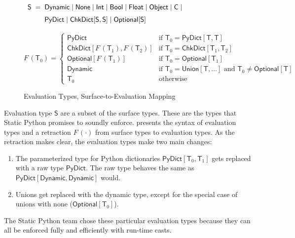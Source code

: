 \documentclass[english,cleveref,submission]{programming}
\makeatletter
\newcommand{\SP}{Static Python}
\newcommand{\defeq}{=}
\newcommand{\mfeq}{=}
\newcommand{\langmid}{\mid} %
\newenvironment{langarray}{\(\def\arraystretch{1.5}\begin{array}{l@{\hspace{2mm}}c@{\hspace{2mm}}l}}{\end{array}\)}
\newcommand{\typefont}[1]{\mathsf{#1}}
\newcommand{\paramtype}[2]{#1[#2]}
\newcommand{\sptype}{\typefont{T}}
\newcommand{\spteval}{\typefont{S}}
\newcommand{\sptclass}{\typefont{C}}
\newcommand{\sptint}{\typefont{Int}}
\newcommand{\sptbool}{\typefont{Bool}}
\newcommand{\sptfloat}{\typefont{Float}}
\newcommand{\sptdyn}{\typefont{Dynamic}}
\newcommand{\sptobject}{\typefont{Object}}
\newcommand{\sptnone}{\typefont{None}}
\newcommand{\sptoptional}[1]{\paramtype{\typefont{Optional}}{#1}}
\newcommand{\sptunion}[1]{\paramtype{\typefont{Union}}{#1}}
\newcommand{\sptrawpydict}{\typefont{PyDict}}
\newcommand{\sptpydict}[2]{\paramtype{\sptrawpydict}{#1, #2}}
\newcommand{\sptchkdict}[2]{\paramtype{\typefont{ChkDict}}{#1, #2}}
\newcommand{\mfapply}[2]{#1\,(#2)}
\newcommand{\mffont}[1]{\mathit{#1}}
\newcommand{\mftypeF}[1]{\mfapply{\mffont{F}}{#1}}
\makeatother
\begin{document}
\begin{figure}[t]
  \begin{langarray}
    \spteval & \defeq &
      \sptdyn \langmid
      \sptnone \langmid
      \sptint \langmid
      \sptbool \langmid
      \sptfloat \langmid
      \sptobject \langmid
      \sptclass \langmid
    \\ & &
      \sptrawpydict \langmid
      \sptchkdict{\spteval}{\spteval} \langmid
      \sptoptional{\spteval}
  \end{langarray}

  \bigskip
  \(
    \mftypeF{\sptype_0}
    \mfeq
    \left\{\begin{array}{ll}
      \sptrawpydict & \mbox{if $\sptype_0 = \sptpydict{\sptype}{\sptype}$}
    \\
      \sptchkdict{\mftypeF{\sptype_1}}{\mftypeF{\sptype_2}} & \mbox{if $\sptype_0 = \sptchkdict{\sptype_1}{\sptype_2}$}
    \\
      \sptoptional{\mftypeF{\sptype_1}} & \mbox{if $\sptype_0 = \sptoptional{\sptype_1}$}
    \\
      \sptdyn & \mbox{if $\sptype_0 = \sptunion{\sptype, \ldots}$ and $\sptype_0 \neq \sptoptional{\sptype}$}
    \\
      \sptype_0 & \mbox{otherwise}
    \end{array}\right.
  \)

  \caption{Evaluation Types, Surface-to-Evaluation Mapping}
  \label{f:surface-to-eval-types}
\end{figure}

Evaluation type $\spteval$ are a subset of the surface types.
These are the types that \SP{} promises to soundly enforce.
 presents the syntax of evaluation types
and a retraction $\mftypeF{\cdot}$ from surface types to evaluation types.
As the retraction makes clear, the evaluation types make two main changes:
\begin{enumerate}
  \item
    The parameterized type for Python dictionaries
    $\sptpydict{\sptype_0}{\sptype_1}$ gets replaced with
    a raw type $\sptrawpydict$.
    The raw type behaves the same as $\sptpydict{\sptdyn}{\sptdyn}$ would.
  \item
    Unions get replaced with the dynamic type, except for the special case
    of unions with none ($\sptoptional{\sptype_0}$).
\end{enumerate}

The \SP{} team chose these particular evaluation types because they can all
be enforced fully and efficiently with run-time casts.
\end{document}
